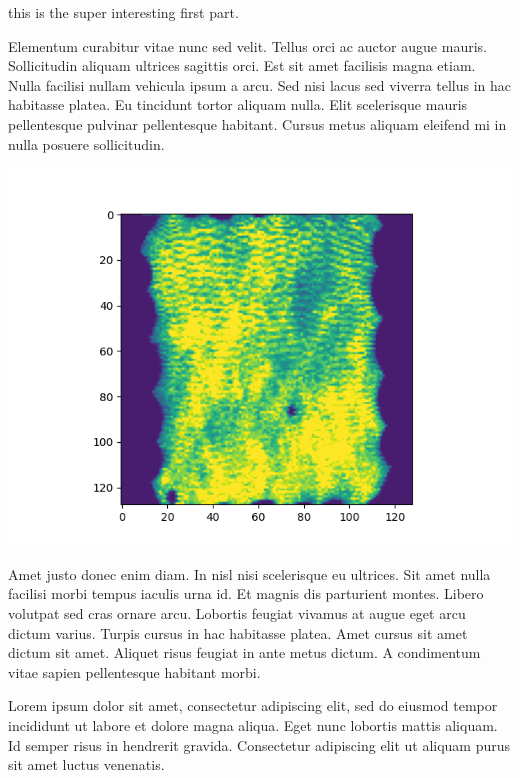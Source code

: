{
    this is the super interesting first part.
    
    
    Elementum curabitur vitae nunc sed velit. Tellus orci ac auctor augue mauris. Sollicitudin aliquam ultrices sagittis orci. Est sit amet facilisis magna etiam. Nulla facilisi nullam vehicula ipsum a arcu. Sed nisi lacus sed viverra tellus in hac habitasse platea. Eu tincidunt tortor aliquam nulla. Elit scelerisque mauris pellentesque pulvinar pellentesque habitant. Cursus metus aliquam eleifend mi in nulla posuere sollicitudin.
    \begin{tikzfigure}
    \label{fig:fig1}
     \includegraphics[width=0.8\colwidth]{Figure/7100_0.png}
    \end{tikzfigure}
    
    \vspace{10pt}

     Amet justo donec enim diam. In nisl nisi scelerisque eu ultrices. Sit amet nulla facilisi morbi tempus iaculis urna id. Et magnis dis parturient montes. Libero volutpat sed cras ornare arcu. Lobortis feugiat vivamus at augue eget arcu dictum varius. Turpis cursus in hac habitasse platea. Amet cursus sit amet dictum sit amet. Aliquet risus feugiat in ante metus dictum. A condimentum vitae sapien pellentesque habitant morbi.
}

\begin{subcolumns}
{
    Lorem ipsum dolor sit amet, consectetur adipiscing elit, sed do eiusmod tempor incididunt ut labore et dolore magna aliqua. Eget nunc lobortis mattis aliquam. Id semper risus in hendrerit gravida. Consectetur adipiscing elit ut aliquam purus sit amet luctus venenatis. 
}
{
}
\end{subcolumns}
